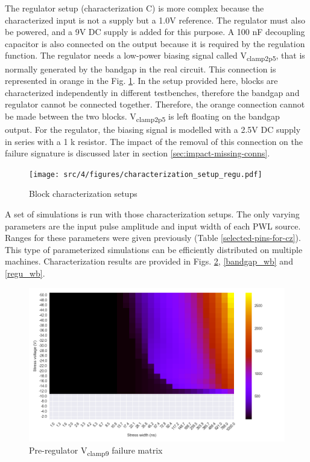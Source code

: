 %
The regulator setup (characterization C) is more complex because the characterized input is not a supply but a 1.0V reference.
The regulator must also be powered, and a 9V DC supply is added for this purpose.
A 100 nF decoupling capacitor is also connected on the output because it is required by the regulation function.
The regulator needs a low-power biasing signal called V\textsubscript{clamp2p5}, that is normally generated by the bandgap in the real circuit.
This connection is represented in orange in the Fig. \ref{fig:block_function_cz_regu}.
In the setup provided here, blocks are characterized independently in different testbenches, therefore the bandgap and regulator cannot be connected together.
Therefore, the orange connection cannot be made between the two blocks.
V\textsubscript{clamp2p5} is left floating on the bandgap output.
For the regulator, the biasing signal is modelled with a 2.5V DC supply in series with a 1 k\textOmega{} resistor.
The impact of the removal of this connection on the failure signature is discussed later in section \ref{sec:impact-missing-conns}.

\begin{figure}[!h]
  \centering
  \texttt{[image: src/4/figures/characterization\_setup\_regu.pdf]}
  \caption{Block characterization setups}
  \label{fig:block_function_cz_regu}
\end{figure}

A set of simulations is run with those characterization setups.
The only varying parameters are the input pulse amplitude and input width of each PWL source.
Ranges for these parameters were given previously (Table \ref{selected-pins-for-cz}).
This type of parameterized simulations can be efficiently distributed on multiple machines.
Characterization results are provided in Figs. \ref{pre_regu_wb}, \ref{bandgap_wb} and \ref{regu_wb}.

\begin{figure}[!h]
  \centering
  \includegraphics[width=\textwidth]{src/4/figures/preregulator_cz.png}
  \caption{Pre-regulator V\textsubscript{clamp9} failure matrix}
  \label{pre_regu_wb}
\end{figure}

